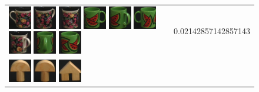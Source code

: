 {\begin{figure}[p]
\begin{tabular}{m{11cm} | m{3cm} |}
\includegraphics[width=1cm]{coil/beeld-61.eps}
\includegraphics[width=1cm]{coil/beeld-63.eps}
\includegraphics[width=1cm]{coil/beeld-62.eps}
\includegraphics[width=1cm]{coil/beeld-30.eps}
\includegraphics[width=1cm]{coil/beeld-34.eps}
\includegraphics[width=1cm]{coil/beeld-31.eps}
\includegraphics[width=1cm]{coil/beeld-64.eps}
\includegraphics[width=1cm]{coil/beeld-35.eps}
\includegraphics[width=1cm]{coil/beeld-33.eps}
& {\scriptsize 0.02142857142857143}
\\
\includegraphics[width=1cm]{coil/beeld-0.eps}
\includegraphics[width=1cm]{coil/beeld-1.eps}
\includegraphics[width=1cm]{coil/beeld-42.eps}

\end{tabular}
\end{figure}}
